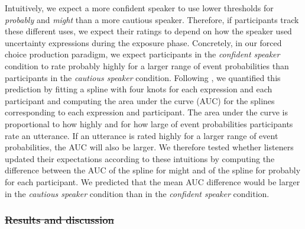 \documentclass[man, floatsintext]{apa6}
\providecommand{\DIFadd}[1]{{\protect\color{blue}\uwave{#1}}} %
\providecommand{\DIFdel}[1]{{\protect\color{red}\sout{#1}}}                      %
\providecommand{\DIFaddbegin}{} %
\providecommand{\DIFaddend}{} %
\providecommand{\DIFdelbegin}{} %
\providecommand{\DIFdelend}{} %
\newcommand{\DIFscaledelfig}{0.5}
\newlength{\DIFdelgraphicswidth} %
\newlength{\DIFdelgraphicsheight} %
\newcommand{\DIFaddincludegraphics}[2][]{{\color{blue}\fbox{\DIFOincludegraphics[#1]{#2}}}} %
\newcommand{\DIFdelincludegraphics}[2][]{%
\sbox{\DIFdelgraphicsbox}{\DIFOincludegraphics[#1]{#2}}%
\settoboxwidth{\DIFdelgraphicswidth}{\DIFdelgraphicsbox} %
\settoboxtotalheight{\DIFdelgraphicsheight}{\DIFdelgraphicsbox} %
\scalebox{\DIFscaledelfig}{%
\parbox[b]{\DIFdelgraphicswidth}{\usebox{\DIFdelgraphicsbox}\\[-\baselineskip] \rule{\DIFdelgraphicswidth}{0em}}\llap{\resizebox{\DIFdelgraphicswidth}{\DIFdelgraphicsheight}{%
\setlength{\unitlength}{\DIFdelgraphicswidth}%
\begin{picture}(1,1)%
\thicklines\linethickness{2pt} %
{\color[rgb]{1,0,0}\put(0,0){\framebox(1,1){}}}%
{\color[rgb]{1,0,0}\put(0,0){\line( 1,1){1}}}%
{\color[rgb]{1,0,0}\put(0,1){\line(1,-1){1}}}%
\end{picture}%
}\hspace*{3pt}}} %
} %
\DeclareRobustCommand{\DIFaddbegin}{\DIFOaddbegin \let\includegraphics\DIFaddincludegraphics} %
\DeclareRobustCommand{\DIFaddend}{\DIFOaddend \let\includegraphics\DIFOincludegraphics} %
\DeclareRobustCommand{\DIFdelbegin}{\DIFOdelbegin \let\includegraphics\DIFdelincludegraphics} %
\DeclareRobustCommand{\DIFdelend}{\DIFOaddend \let\includegraphics\DIFOincludegraphics} %
\begin{document}
Intuitively, we expect a more confident speaker to use lower thresholds for {\it probably} and {\it might} than a more cautious speaker.
Therefore, if participants track these different uses, we expect their ratings to depend on how the speaker used uncertainty expressions during the exposure phase. 
Concretely,  in our forced choice production paradigm, we expect participants in the \textit{confident speaker} condition to rate {\sc probably} highly for a larger range of event probabilities than participants
in the \textit{cautious speaker} condition. 
Following \cite{Yildirim2016}, we quantified this prediction by fitting a spline with four knots for each expression and each participant and computing the area 
under the curve (AUC) for the splines corresponding to each expression and participant. The area under the curve is proportional to how highly and for how large 
of event probabilities participants rate an utterance. If an utterance is rated highly for a larger range of event probabilities, the AUC will also be larger. 
We therefore tested whether listeners updated their expectations according to these intuitions by computing the difference between the AUC of the spline for 
{\sc might} and of the spline for {\sc probably} for each participant. We predicted that the mean AUC difference would be larger in the 
\emph{cautious speaker} condition than in the \emph{confident speaker} condition.

\DIFdelbegin \subsubsection{\DIFdel{Results and discussion}}
\addtocounter{subsubsection}{-1}%
\DIFdelend \DIFaddbegin \subsection{\DIFadd{Results and discussion}}
\DIFaddend 
\end{document}
